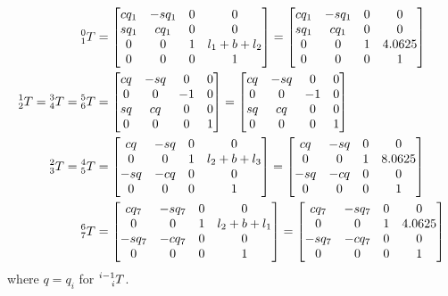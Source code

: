 \documentclass{article}
\begin{document}
\begin{align*}
  \prescript{0}{1}T &= \begin{bmatrix}
    cq_1 & -sq_1 & 0 & 0 \\
    sq_1 & cq_1 & 0 & 0 \\
    0 & 0 & 1 & l_1 + b + l_2 \\
    0 & 0 & 0 & 1
  \end{bmatrix} = \begin{bmatrix}
    cq_1 & -sq_1 & 0 & 0 \\
    sq_1 & cq_1 & 0 & 0 \\
    0 & 0 & 1 & 4.0625 \\
    0 & 0 & 0 & 1
  \end{bmatrix} \\
  \prescript{1}{2}T = \prescript{3}{4}T = \prescript{5}{6}T &= \begin{bmatrix}
    cq & -sq & 0 & 0 \\
    0 & 0 & -1 & 0 \\
    sq & cq & 0 & 0 \\
    0 & 0 & 0 & 1
  \end{bmatrix} = \begin{bmatrix}
    cq & -sq & 0 & 0 \\
    0 & 0 & -1 & 0 \\
    sq & cq & 0 & 0 \\
    0 & 0 & 0 & 1
  \end{bmatrix} \\
  \prescript{2}{3}T = \prescript{4}{5}T &= \begin{bmatrix}
    cq & -sq & 0 & 0 \\
    0 & 0 & 1 & l_2 + b + l_3 \\
    -sq & -cq & 0 & 0 \\
    0 & 0 & 0 & 1
  \end{bmatrix} = \begin{bmatrix}
    cq & -sq & 0 & 0 \\
    0 & 0 & 1 & 8.0625 \\
    -sq & -cq & 0 & 0 \\
    0 & 0 & 0 & 1
  \end{bmatrix} \\
  \prescript{6}{7}T &= \begin{bmatrix}
    cq_7 & -sq_7 & 0 & 0 \\
    0 & 0 & 1 & l_2 + b + l_1 \\
    -sq_7 & -cq_7 & 0 & 0 \\
    0 & 0 & 0 & 1
  \end{bmatrix} = \begin{bmatrix}
    cq_7 & -sq_7 & 0 & 0 \\
    0 & 0 & 1 & 4.0625 \\
    -sq_7 & -cq_7 & 0 & 0 \\
    0 & 0 & 0 & 1
  \end{bmatrix}
\end{align*}
where $q = q_i$ for $\prescript{i-1}{i}T$.
\end{document}
